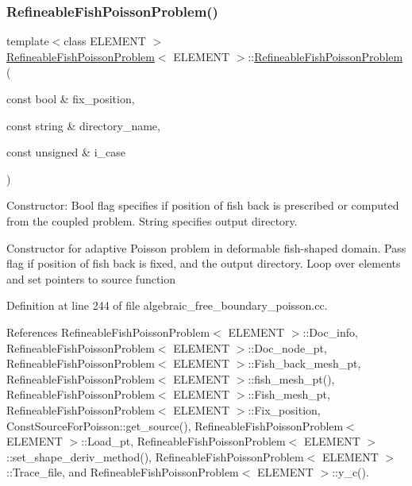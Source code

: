\subsubsection{\texorpdfstring{Refineable\+Fish\+Poisson\+Problem()}{RefineableFishPoissonProblem()}\hspace{0.1cm}{\footnotesize\ttfamily [1/2]}}
{\footnotesize\ttfamily template$<$class E\+L\+E\+M\+E\+NT $>$ \\
\hyperlink{classRefineableFishPoissonProblem}{Refineable\+Fish\+Poisson\+Problem}$<$ E\+L\+E\+M\+E\+NT $>$\+::\hyperlink{classRefineableFishPoissonProblem}{Refineable\+Fish\+Poisson\+Problem} (\begin{DoxyParamCaption}\item[{const bool \&}]{fix\+\_\+position,  }\item[{const string \&}]{directory\+\_\+name,  }\item[{const unsigned \&}]{i\+\_\+case }\end{DoxyParamCaption})}



Constructor\+: Bool flag specifies if position of fish back is prescribed or computed from the coupled problem. String specifies output directory. 

Constructor for adaptive Poisson problem in deformable fish-\/shaped domain. Pass flag if position of fish back is fixed, and the output directory. Loop over elements and set pointers to source function 

Definition at line 244 of file algebraic\+\_\+free\+\_\+boundary\+\_\+poisson.\+cc.



References Refineable\+Fish\+Poisson\+Problem$<$ E\+L\+E\+M\+E\+N\+T $>$\+::\+Doc\+\_\+info, Refineable\+Fish\+Poisson\+Problem$<$ E\+L\+E\+M\+E\+N\+T $>$\+::\+Doc\+\_\+node\+\_\+pt, Refineable\+Fish\+Poisson\+Problem$<$ E\+L\+E\+M\+E\+N\+T $>$\+::\+Fish\+\_\+back\+\_\+mesh\+\_\+pt, Refineable\+Fish\+Poisson\+Problem$<$ E\+L\+E\+M\+E\+N\+T $>$\+::fish\+\_\+mesh\+\_\+pt(), Refineable\+Fish\+Poisson\+Problem$<$ E\+L\+E\+M\+E\+N\+T $>$\+::\+Fish\+\_\+mesh\+\_\+pt, Refineable\+Fish\+Poisson\+Problem$<$ E\+L\+E\+M\+E\+N\+T $>$\+::\+Fix\+\_\+position, Const\+Source\+For\+Poisson\+::get\+\_\+source(), Refineable\+Fish\+Poisson\+Problem$<$ E\+L\+E\+M\+E\+N\+T $>$\+::\+Load\+\_\+pt, Refineable\+Fish\+Poisson\+Problem$<$ E\+L\+E\+M\+E\+N\+T $>$\+::set\+\_\+shape\+\_\+deriv\+\_\+method(), Refineable\+Fish\+Poisson\+Problem$<$ E\+L\+E\+M\+E\+N\+T $>$\+::\+Trace\+\_\+file, and Refineable\+Fish\+Poisson\+Problem$<$ E\+L\+E\+M\+E\+N\+T $>$\+::y\+\_\+c().

